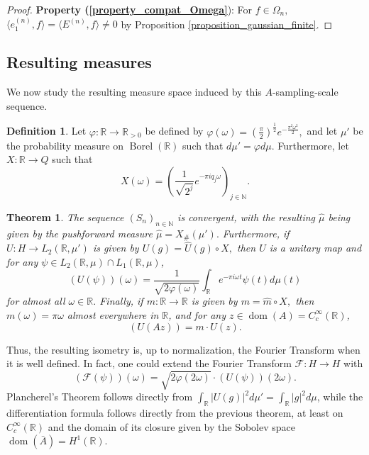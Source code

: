 \documentclass{amsart}
\newtheorem{theorem}{Theorem}[section]
\theoremstyle{definition}
\newtheorem{definition}[thm]{Definition}
\theoremstyle{remark}
\def \Dom{\operatorname{dom}}
\def \Borel{\operatorname{Borel}}
\def \HMU{\hat{\mu}}
\def \HU{\hat{U}}
\def \Hm{\hat{m}}
\def \LL{\langle}
\def \RR{\rangle}
\begin{document}
\begin{proof}
	
	\textbf{Property (\ref{property_compat_Omega}}): For $f\in\Omega_n,$ $\LL e_1^{(n)}, f\RR=\LL E^{(n)},f\RR\neq 0$ by Proposition \ref{proposition_gaussian_finite}.
\end{proof}

\subsection{Resulting measures}

We now study the resulting measure space induced by this $A$-sampling-scale sequence.
\begin{definition}
	Let $\varphi:\mathbb{R}\rightarrow\mathbb{R}_{>0}$ be defined by $\varphi(\omega)=\left(\frac{\pi}{2}\right)^{\frac{1}{2}}e^{-\frac{\pi^2\omega^2}{2}},$ and let $\mu'$ be the probability measure on $\Borel(\mathbb{R})$ such that $d\mu'=\varphi d\mu.$ Furthermore, let $X:\mathbb{R}\rightarrow Q$ such that $$X(\omega)=\left(\frac{1}{\sqrt{2^{j}}}e^{-\pi i q_j \omega}\right)_{j\in\mathbb{N}}.$$
\end{definition}
\begin{theorem}\label{theorem_differential_fourier_transform}
	The sequence $(S_n)_{n\in\mathbb{N}}$ is convergent, with the resulting $\HMU$ being given by the pushforward measure $\HMU=X_{\#}(\mu').$ Furthermore, if $U:H\rightarrow L_2(\mathbb{R},\mu')$ is given by $U(g)=\HU(g)\circ X,$ then $U$ is a unitary map and for any $\psi\in L_2(\mathbb{R},\mu)\cap L_1(\mathbb{R},\mu)$, $$(U(\psi))(\omega)=\frac{1}{\sqrt{2\varphi(\omega)}}\int_{\mathbb{R}}e^{-\pi i \omega t} \psi(t)d\mu(t)$$ for almost all $\omega\in \mathbb{R}.$ Finally, if $m:\mathbb{R}\rightarrow\mathbb{R}$ is given by $m=\Hm\circ X,$ then $m(\omega)=\pi \omega$ almost everywhere in $\mathbb{R}$, and for any $z\in \Dom(A)=C_c^{\infty}(\mathbb{R})$, $$(U(Az))=m\cdot U(z).$$
\end{theorem}

Thus, the resulting  isometry is, up to normalization, the Fourier Transform when it is well defined. In fact, one could extend the Fourier Transform $\mathcal{F}:H\rightarrow H$ with $$(\mathcal{F}(\psi))(\omega)=\sqrt{2\varphi(2\omega)}\cdot(U(\psi))(2\omega).$$
Plancherel's Theorem follows directly from $\int_{\mathbb{R}}|U(g)|^2d\mu'=\int_{\mathbb{R}}|g|^2d\mu$, while the differentiation formula follows directly from the previous theorem, at least on $C_c^{\infty}(\mathbb{R})$ and the domain of its closure given by the Sobolev space $\Dom(\bar{A})=H^1(\mathbb{R})$.
\end{document}
